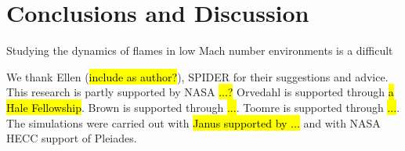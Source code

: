 \documentclass[apj,twocolumn]{emulateapj}
\begin{document}
\section{Conclusions and Discussion}
\label{sec:conclusions}
Studying the dynamics of flames in low Mach number environments is a difficult 



\bigskip
We thank Ellen (\hl{include as author?}), SPIDER for their suggestions and 
advice. This research is partly supported by NASA \hl{...?} Orvedahl is 
supported through \hl{a Hale Fellowship}. Brown is supported through \hl{...}. 
Toomre is supported through \hl{...}. The simulations were carried out with 
\hl{Janus supported by ...} and with NASA HECC support of Pleiades.









\end{document}
